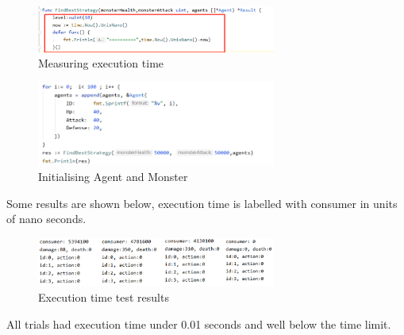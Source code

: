 \noindent

\begin{figure}[htb]
    \centering
    \includegraphics[width=0.7\textwidth]{008_team_5_agent_design/images/10.png}
    \caption{Measuring execution time}
    \label{testingexecutiontime}
\end{figure}

\noindent   

\begin{figure}[!ht]
    \centering
    \includegraphics[width=0.7\textwidth]{008_team_5_agent_design/images/11.png}
    \caption{Initialising Agent and Monster}
    \label{initialisingagentandmonster}
\end{figure}

\noindent

\noindent Some results are shown below, execution time is labelled with consumer in units of nano seconds.

\noindent

\begin{figure}[!ht]
    \centering
    \includegraphics[width=0.7\textwidth]{008_team_5_agent_design/images/12.png}
    \caption{Execution time test results}
    \label{executiontimetestresults}
\end{figure}

\noindent

\noindent All trials had execution time under 0.01 seconds and well below the time limit.
